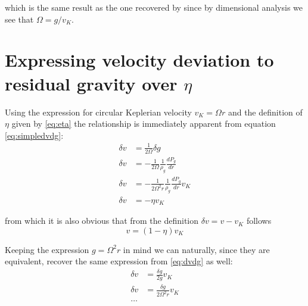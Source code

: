 \documentclass[12pt]{article}
\begin{document}
\noindent which is the same result as the one recovered by \citet{Weidenschilling77} since by dimensional analysis we see that $\Omega = g/v_K$.

\section{Expressing velocity deviation to residual gravity over $\eta$}
\label{appendix:B}

Using the expression for circular Keplerian velocity $v_K = \Omega r$ and the definition of $\eta$ given by \ref{eq:eta} the relationship is immediately apparent from equation \ref{eq:simpledvdg}:
\begin{align}
    \delta v &= \frac{1}{2\Omega}\delta g \\
    \delta v &= -\frac{1}{2\Omega}\frac{1}{\rho_g}\frac{dP_g}{dr} \\
    \delta v &= -\frac{1}{2\Omega^2r}\frac{1}{\rho_g}\frac{dP_g}{dr} v_K \\
    \delta v &= - \eta v_K
\end{align}

\noindent from which it is also obvious that from the definition $\delta v = v-v_K$ follows
\begin{equation}
    v = (1-\eta)v_K
\end{equation}

Keeping the expression $g=\Omega^2 r$ in mind we can naturally, since they are equivalent, recover the same expression from \ref{eq:dvdg} as well: 
\begin{align}
    \delta v &= \frac{\delta g}{2 g} v_K \\
    \delta v &= \frac{\delta g}{2 \Omega^2 r} v_K \\
    \dots& \nonumber
\end{align}




 
\end{document}
